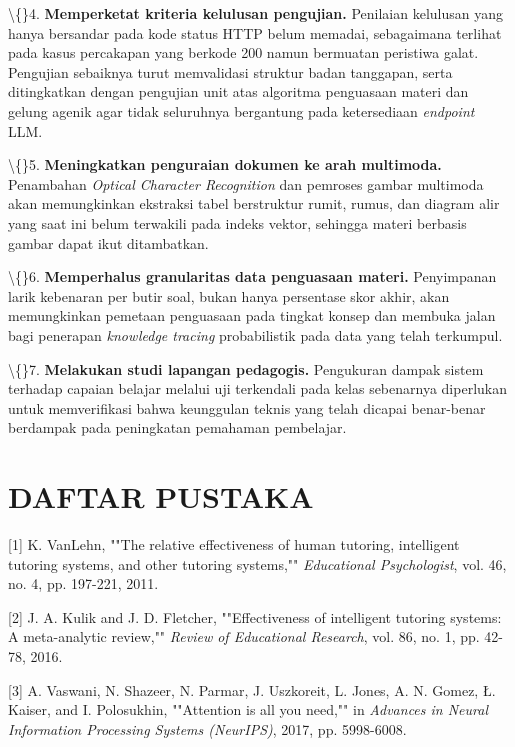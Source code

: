 \documentclass[12pt,a4paper]{article}
\begin{document}
\textbackslash\{\}4. \textbf{Memperketat kriteria kelulusan pengujian.} Penilaian kelulusan yang hanya bersandar pada kode status HTTP belum memadai, sebagaimana terlihat pada kasus percakapan yang berkode 200 namun bermuatan peristiwa galat. Pengujian sebaiknya turut memvalidasi struktur badan tanggapan, serta ditingkatkan dengan pengujian unit atas algoritma penguasaan materi dan gelung agenik agar tidak seluruhnya bergantung pada ketersediaan \textit{endpoint} LLM.



\textbackslash\{\}5. \textbf{Meningkatkan penguraian dokumen ke arah multimoda.} Penambahan \textit{Optical Character Recognition} dan pemroses gambar multimoda akan memungkinkan ekstraksi tabel berstruktur rumit, rumus, dan diagram alir yang saat ini belum terwakili pada indeks vektor, sehingga materi berbasis gambar dapat ikut ditambatkan.



\textbackslash\{\}6. \textbf{Memperhalus granularitas data penguasaan materi.} Penyimpanan larik kebenaran per butir soal, bukan hanya persentase skor akhir, akan memungkinkan pemetaan penguasaan pada tingkat konsep dan membuka jalan bagi penerapan \textit{knowledge tracing} probabilistik pada data yang telah terkumpul.



\textbackslash\{\}7. \textbf{Melakukan studi lapangan pedagogis.} Pengukuran dampak sistem terhadap capaian belajar melalui uji terkendali pada kelas sebenarnya diperlukan untuk memverifikasi bahwa keunggulan teknis yang telah dicapai benar-benar berdampak pada peningkatan pemahaman pembelajar.



\section*{DAFTAR PUSTAKA}

{[}1{]}	K. VanLehn, ""The relative effectiveness of human tutoring, intelligent tutoring systems, and other tutoring systems,"" \textit{Educational Psychologist}, vol. 46, no. 4, pp. 197-221, 2011.



{[}2{]}	J. A. Kulik and J. D. Fletcher, ""Effectiveness of intelligent tutoring systems: A meta-analytic review,"" \textit{Review of Educational Research}, vol. 86, no. 1, pp. 42-78, 2016.



{[}3{]}	A. Vaswani, N. Shazeer, N. Parmar, J. Uszkoreit, L. Jones, A. N. Gomez, Ł. Kaiser, and I. Polosukhin, ""Attention is all you need,"" in \textit{Advances in Neural Information Processing Systems (NeurIPS)}, 2017, pp. 5998-6008.
\end{document}
